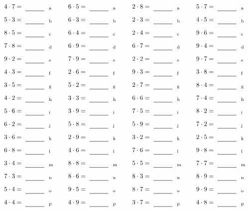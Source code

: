 \documentclass
[
  draft    = true,
  fontsize = 11pt,
  parskip  = half-
]
{scrartcl}
\begin{document}
\par\vfill\par
\begin{align*}
    \pline{4\cdot7}&=\rline{a}
  & \pline{6\cdot5}&=\rline{a}
  & \pline{2\cdot8}&=\rline{a}
  & \pline{5\cdot7}&=\rline{a} \\[1ex]
    \pline{5\cdot3}&=\rline{b}
  & \pline{6\cdot3}&=\rline{b}
  & \pline{2\cdot3}&=\rline{b}
  & \pline{4\cdot5}&=\rline{b} \\[1ex]
    \pline{8\cdot5}&=\rline{c}
  & \pline{6\cdot4}&=\rline{c}
  & \pline{2\cdot4}&=\rline{c}
  & \pline{9\cdot6}&=\rline{c} \\[1ex]
    \pline{7\cdot8}&=\rline{d}
  & \pline{6\cdot9}&=\rline{d}
  & \pline{6\cdot7}&=\rline{d}
  & \pline{9\cdot4}&=\rline{d} \\[1ex]
    \pline{9\cdot2}&=\rline{e}
  & \pline{7\cdot9}&=\rline{e}
  & \pline{2\cdot2}&=\rline{e}
  & \pline{9\cdot7}&=\rline{e} \\[1ex]
    \pline{4\cdot3}&=\rline{f}
  & \pline{2\cdot6}&=\rline{f}
  & \pline{9\cdot3}&=\rline{f}
  & \pline{3\cdot8}&=\rline{f} \\[1ex]
    \pline{3\cdot5}&=\rline{g}
  & \pline{5\cdot2}&=\rline{g}
  & \pline{2\cdot7}&=\rline{g}
  & \pline{8\cdot4}&=\rline{g} \\[1ex]
    \pline{4\cdot2}&=\rline{h}
  & \pline{3\cdot3}&=\rline{h}
  & \pline{6\cdot6}&=\rline{h}
  & \pline{7\cdot4}&=\rline{h} \\[1ex]
    \pline{5\cdot6}&=\rline{i}
  & \pline{3\cdot9}&=\rline{i}
  & \pline{7\cdot5}&=\rline{i}
  & \pline{8\cdot2}&=\rline{i} \\[1ex]
    \pline{6\cdot2}&=\rline{j}
  & \pline{5\cdot8}&=\rline{j}
  & \pline{5\cdot9}&=\rline{j}
  & \pline{7\cdot2}&=\rline{j} \\[1ex]
    \pline{3\cdot6}&=\rline{k}
  & \pline{2\cdot9}&=\rline{k}
  & \pline{3\cdot2}&=\rline{k}
  & \pline{2\cdot5}&=\rline{k} \\[1ex]
    \pline{6\cdot8}&=\rline{l}
  & \pline{4\cdot6}&=\rline{l}
  & \pline{7\cdot6}&=\rline{l}
  & \pline{9\cdot8}&=\rline{l} \\[1ex]
    \pline{3\cdot4}&=\rline{m}
  & \pline{8\cdot8}&=\rline{m}
  & \pline{5\cdot5}&=\rline{m}
  & \pline{7\cdot7}&=\rline{m} \\[1ex]
    \pline{7\cdot3}&=\rline{n}
  & \pline{8\cdot6}&=\rline{n}
  & \pline{8\cdot3}&=\rline{n}
  & \pline{8\cdot9}&=\rline{n} \\[1ex]
    \pline{5\cdot4}&=\rline{o}
  & \pline{9\cdot5}&=\rline{o}
  & \pline{8\cdot7}&=\rline{o}
  & \pline{9\cdot9}&=\rline{o} \\[1ex]
    \pline{4\cdot4}&=\rline{p}
  & \pline{4\cdot9}&=\rline{p}
  & \pline{3\cdot7}&=\rline{p}
  & \pline{4\cdot8}&=\rline{p}
\end{align*}
\end{document}
